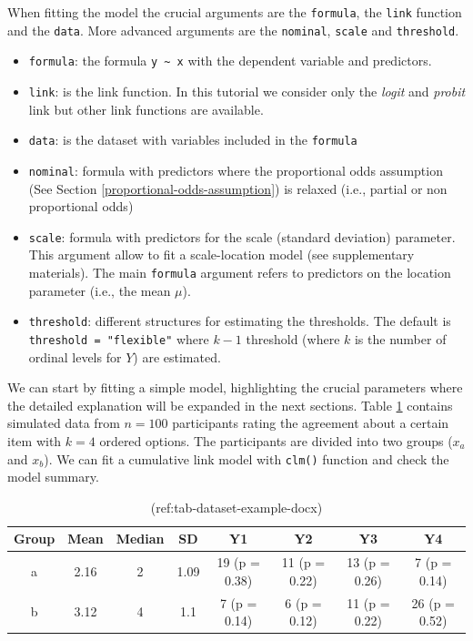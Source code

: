 \documentclass[
  man, mask,floatsintext]{apa6}
\providecommand{\tightlist}{%
  \setlength{\itemsep}{0pt}\setlength{\parskip}{0pt}}
\begin{document}
When fitting the model the crucial arguments are the \texttt{formula}, the \texttt{link} function and the \texttt{data}. More advanced arguments are the \texttt{nominal}, \texttt{scale} and \texttt{threshold}.

\begin{itemize}
\tightlist
\item
  \texttt{formula}: the formula \texttt{y\ \textasciitilde{}\ x} with the dependent variable and predictors.
\item
  \texttt{link}: is the link function. In this tutorial we consider only the \emph{logit} and \emph{probit} link but other link functions are available.
\item
  \texttt{data}: is the dataset with variables included in the \texttt{formula}
\item
  \texttt{nominal}: formula with predictors where the proportional odds assumption (See Section \ref{proportional-odds-assumption}) is relaxed (i.e., partial or non proportional odds)
\item
  \texttt{scale}: formula with predictors for the scale (standard deviation) parameter. This argument allow to fit a scale-location model (see supplementary materials). The main \texttt{formula} argument refers to predictors on the location parameter (i.e., the mean \(\mu\)).
\item
  \texttt{threshold}: different structures for estimating the thresholds. The default is \texttt{threshold\ =\ "flexible"} where \(k - 1\) threshold (where \(k\) is the number of ordinal levels for \(Y\)) are estimated.
\end{itemize}

We can start by fitting a simple model, highlighting the crucial parameters where the detailed explanation will be expanded in the next sections. Table \ref{tab:tab-dataset-example-latex} contains simulated data from \(n = 100\) participants rating the agreement about a certain item with \(k = 4\) ordered options. The participants are divided into two groups (\(x_a\) and \(x_b\)). We can fit a cumulative link model with \texttt{clm()} function and check the model summary.

\scriptsize

\normalsize

\scriptsize

\begin{table}

\caption{\label{tab:tab-dataset-example-latex}(ref:tab-dataset-example-docx)}
\centering
\begin{tabular}[t]{cccccccc}
\toprule
\textbf{Group} & \textbf{Mean} & \textbf{Median} & \textbf{SD} & \textbf{Y1} & \textbf{Y2} & \textbf{Y3} & \textbf{Y4}\\
\midrule
a & 2.16 & 2 & 1.09 & 19 (p = 0.38) & 11 (p = 0.22) & 13 (p = 0.26) & 7 (p = 0.14)\\
b & 3.12 & 4 & 1.1 & 7 (p = 0.14) & 6 (p = 0.12) & 11 (p = 0.22) & 26 (p = 0.52)\\
\bottomrule
\end{tabular}
\end{table}
\end{document}
